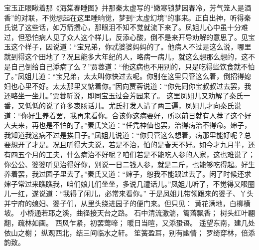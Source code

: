\documentclass[12pt,oneside]{book}
\begin{document}
宝玉正眼瞅着那《海棠春睡图》并那秦太虚写的“嫩寒锁梦因春冷，芳气笼人是酒香”的对联，不觉想起在这里睡晌觉，梦到“太虚幻境”的事来。正自出神，听得秦氏说了这些话，如万箭攒心，那眼泪不知不觉就流下来了。凤姐儿心中虽十分难过，但恐怕病人见了众人这个样儿，反添心酸，倒不是来开导劝解的意思了。见宝玉这个样子，因说道：“宝兄弟，你忒婆婆妈妈的了。他病人不过是这么说，哪里就到得这个田地了？况且能多大年纪的人，略病一病儿，就这么想那么想的，这不是自己倒给自己添病了么？”贾蓉道：“他这病也不用别的，只是吃得些饮食就不怕了。”凤姐儿道：“宝兄弟，太太叫你快过去呢。你别在这里只管这么着，倒招得媳妇也心里不好。太太那里又惦着你。”因向贾蓉说道：“你先同你宝叔叔过去罢，我还略坐一坐儿。”贾蓉听说，即同宝玉过会芳园来了。
这里凤姐儿又劝解了秦氏一番，又低低的说了许多衷肠话儿。尤氏打发人请了两三遍，凤姐儿才向秦氏说道：“你好生养着罢，我再来看你。合该你这病要好，所以前日就有人荐了这个好大夫来，再也是不怕的了。”秦氏笑道：“任凭神仙也罢，治得病治不得命。婶子，我知道我这病不过是挨日子。”凤姐儿说道：“你只管这么想着，病那里能好呢？总要想开了才是。况且听得大夫说，若是不治，怕的是春天不好。如今才九月半，还有四五个月的工夫，什么病治不好呢？咱们若是不能吃人参的人家，这也难说了；你公公、婆婆听见治得好你，别说一日二钱人参，就是二斤，也能够吃得起。好生养着罢，我过园子里去了。”秦氏又道：“婶子，恕我不能跟过去了。闲了时候还求婶子常过来瞧瞧我，咱们娘儿们坐坐，多说几遭话儿。”凤姐儿听了，不觉得又眼圈儿一红，遂说道：“我得了闲儿，必常来看你。”
于是凤姐儿带领跟来的婆子、丫头并宁府的媳妇、婆子们，从里头绕进园子的便门来。但只见：
黄花满地，白柳横坡。
小桥通若耶之溪，曲径接天台之路。
石中清流激湍，篱落飘香；
树头红叶翩翻，疏林如画。
西风乍紧，初罢莺啼；
暖日当暄，又添蛩语。
遥望东南，建几处依山之榭；
纵观西北，结三间临水之轩。
笙簧盈耳，别有幽情；
罗绮穿林，倍添韵致。
\end{document}
